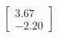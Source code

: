 \documentclass[preview]{standalone}
\begin{document}
\begin{align*}
\begin{bmatrix} 3.67 \\ -2.20 \end{bmatrix}
\end{align*}
\end{document}
